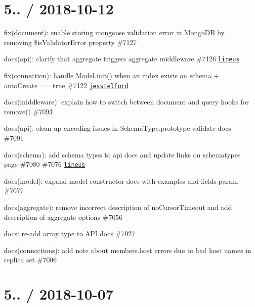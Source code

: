 \section*{5.. / 2018-\/10-\/12 }


\begin{DoxyItemize}
\item fix(document)\+: enable storing mongoose validation error in Mongo\+DB by removing {\ttfamily \$is\+Validator\+Error} property \#7127
\item docs(api)\+: clarify that aggregate triggers aggregate middleware \#7126 \href{https://github.com/lineus}{\tt lineus}
\item fix(connection)\+: handle Model.\+init() when an index exists on schema + auto\+Create == true \#7122 \href{https://github.com/jesstelford}{\tt jesstelford}
\item docs(middleware)\+: explain how to switch between document and query hooks for {\ttfamily remove()} \#7093
\item docs(api)\+: clean up encoding issues in Schema\+Type.\+prototype.\+validate docs \#7091
\item docs(schema)\+: add schema types to api docs and update links on schematypes page \#7080 \#7076 \href{https://github.com/lineus}{\tt lineus}
\item docs(model)\+: expand model constructor docs with examples and {\ttfamily fields} param \#7077
\item docs(aggregate)\+: remove incorrect description of no\+Cursor\+Timeout and add description of aggregate options \#7056
\item docs\+: re-\/add array type to A\+PI docs \#7027
\item docs(connections)\+: add note about {\ttfamily members.\+host} errors due to bad host names in replica set \#7006
\end{DoxyItemize}

\section*{5.. / 2018-\/10-\/07 }


